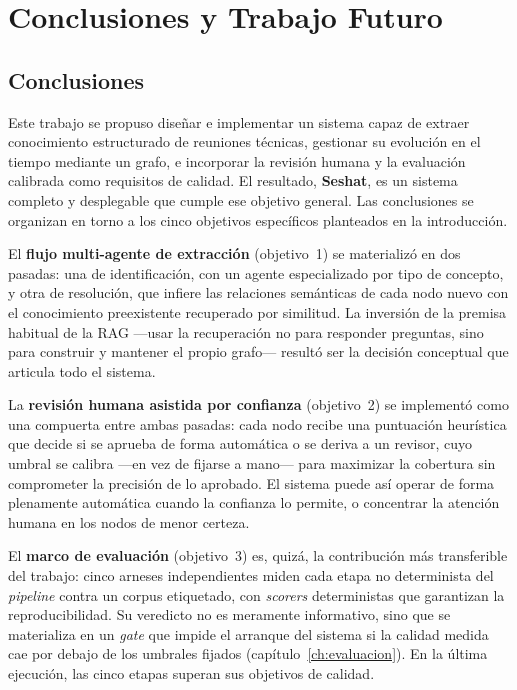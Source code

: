 \chapter{Conclusiones y Trabajo Futuro}
\label{ch:conclusiones}

\section{Conclusiones}

Este trabajo se propuso diseñar e implementar un sistema capaz de extraer conocimiento estructurado
de reuniones técnicas, gestionar su evolución en el tiempo mediante un grafo, e incorporar la
revisión humana y la evaluación calibrada como requisitos de calidad. El resultado, \textbf{Seshat},
es un sistema completo y desplegable que cumple ese objetivo general. Las conclusiones se organizan
en torno a los cinco objetivos específicos planteados en la introducción.

El \textbf{flujo multi-agente de extracción} (objetivo~1) se materializó en dos pasadas: una de
identificación, con un agente especializado por tipo de concepto, y otra de resolución, que infiere
las relaciones semánticas de cada nodo nuevo con el conocimiento preexistente recuperado por
similitud. La inversión de la premisa habitual de la \ac{RAG} —usar la recuperación no para
responder preguntas, sino para construir y mantener el propio grafo— resultó ser la decisión
conceptual que articula todo el sistema.

La \textbf{revisión humana asistida por confianza} (objetivo~2) se implementó como una compuerta
entre ambas pasadas: cada nodo recibe una puntuación heurística que decide si se aprueba de forma
automática o se deriva a un revisor, cuyo umbral se calibra —en vez de fijarse a mano— para
maximizar la cobertura sin comprometer la precisión de lo aprobado. El sistema puede así operar de
forma plenamente automática cuando la confianza lo permite, o concentrar la atención humana en los
nodos de menor certeza.

El \textbf{marco de evaluación} (objetivo~3) es, quizá, la contribución más transferible del
trabajo: cinco arneses independientes miden cada etapa no determinista del \textit{pipeline} contra
un corpus etiquetado, con \textit{scorers} deterministas que garantizan la reproducibilidad. Su
veredicto no es meramente informativo, sino que se materializa en un \textit{gate} que impide el
arranque del sistema si la calidad medida cae por debajo de los umbrales fijados
(capítulo~\ref{ch:evaluacion}). En la última ejecución, las cinco etapas superan sus objetivos de
calidad.


